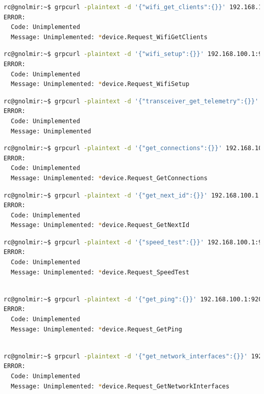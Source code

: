 \documentclass[IN,11pt,twoside,openright,idp,english]{tumthesis}
\begin{document}
\begin{lstlisting}[language=bash,basicstyle=\tiny]
rc@gnolmir:~$ grpcurl -plaintext -d '{"wifi_get_clients":{}}' 192.168.100.1:9200 SpaceX.API.Device.Device/Handle
ERROR:
  Code: Unimplemented
  Message: Unimplemented: *device.Request_WifiGetClients
\end{lstlisting}

\begin{lstlisting}[language=bash,basicstyle=\tiny]
rc@gnolmir:~$ grpcurl -plaintext -d '{"wifi_setup":{}}' 192.168.100.1:9200 SpaceX.API.Device.Device/Handle
ERROR:
  Code: Unimplemented
  Message: Unimplemented: *device.Request_WifiSetup
\end{lstlisting}

\begin{lstlisting}[language=bash,basicstyle=\tiny]
rc@gnolmir:~$ grpcurl -plaintext -d '{"transceiver_get_telemetry":{}}' 192.168.100.1:9200 SpaceX.API.Device.Device/Handle
ERROR:
  Code: Unimplemented
  Message: Unimplemented
\end{lstlisting}

\begin{lstlisting}[language=bash,basicstyle=\tiny]
rc@gnolmir:~$ grpcurl -plaintext -d '{"get_connections":{}}' 192.168.100.1:9200 SpaceX.API.Device.Device/Handle
ERROR:
  Code: Unimplemented
  Message: Unimplemented: *device.Request_GetConnections
\end{lstlisting}

\begin{lstlisting}[language=bash,basicstyle=\tiny]
rc@gnolmir:~$ grpcurl -plaintext -d '{"get_next_id":{}}' 192.168.100.1:9200 SpaceX.API.Device.Device/Handle
ERROR:
  Code: Unimplemented
  Message: Unimplemented: *device.Request_GetNextId
\end{lstlisting}

\begin{lstlisting}[language=bash,basicstyle=\tiny]
rc@gnolmir:~$ grpcurl -plaintext -d '{"speed_test":{}}' 192.168.100.1:9200 SpaceX.API.Device.Device/Handle
ERROR:
  Code: Unimplemented
  Message: Unimplemented: *device.Request_SpeedTest
\end{lstlisting}
\begin{lstlisting}[language=bash,basicstyle=\tiny]
  
rc@gnolmir:~$ grpcurl -plaintext -d '{"get_ping":{}}' 192.168.100.1:9200 SpaceX.API.Device.Device/Handle
ERROR:
  Code: Unimplemented
  Message: Unimplemented: *device.Request_GetPing
\end{lstlisting}
\begin{lstlisting}[language=bash,basicstyle=\tiny]

rc@gnolmir:~$ grpcurl -plaintext -d '{"get_network_interfaces":{}}' 192.168.100.1:9200 SpaceX.API.Device.Device/Handle
ERROR:
  Code: Unimplemented
  Message: Unimplemented: *device.Request_GetNetworkInterfaces
\end{lstlisting}
\end{document}
